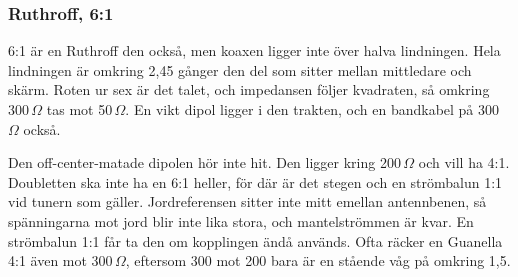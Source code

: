 \subsubsection{Ruthroff, 6:1}
\label{sec:ruthroff-61}

6:1 är en Ruthroff den också, men koaxen ligger inte över halva lindningen. Hela
lindningen är omkring 2,45 gånger den del som sitter mellan mittledare
och skärm. Roten ur sex är det talet, och impedansen följer kvadraten,
så omkring 300\,$\Omega$ tas mot 50\,$\Omega$. En vikt dipol ligger i
den trakten, och en bandkabel på 300\,$\Omega$ också.

Den off-center-matade dipolen hör inte hit. Den ligger kring 200\,$\Omega$
och vill ha 4:1. Doubletten ska inte ha en 6:1 heller, för där är det
stegen och en strömbalun 1:1 vid tunern som gäller. Jordreferensen sitter
inte mitt emellan antennbenen, så spänningarna mot jord blir inte lika
stora, och mantelströmmen är kvar. En strömbalun 1:1 får ta den om
kopplingen ändå används. Ofta räcker en Guanella 4:1 även mot 300\,$\Omega$,
eftersom 300 mot 200 bara är en stående våg på omkring 1,5.

